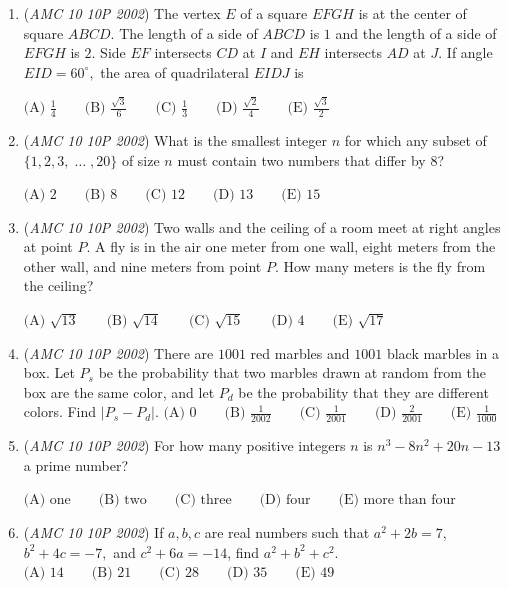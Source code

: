 \begin{enumerate}
 $\text{(A) }\frac{1}{3} \qquad \text{(B) }\frac{4}{11} \qquad \text{(C) }\frac{2}{5} \qquad \text{(D) }\frac{4}{9} \qquad \text{(E) }\frac{1}{2}$


	\item (\textit{AMC 10 10P 2002}) The vertex $E$ of a square $EFGH$ is at the center of square $ABCD.$ The length of a side of $ABCD$ is $1$ and the length of a side of $EFGH$ is $2.$ Side $EF$ intersects $CD$ at $I$ and $EH$ intersects $AD$ at $J.$ If angle $EID=60^{\circ},$ the area of quadrilateral $EIDJ$ is


 $\text{(A) }\frac{1}{4} \qquad \text{(B) }\frac{\sqrt{3}}{6} \qquad \text{(C) }\frac{1}{3} \qquad \text{(D) }\frac{\sqrt{2}}{4} \qquad \text{(E) }\frac{\sqrt{3}}{2}$


	\item (\textit{AMC 10 10P 2002}) What is the smallest integer $n$ for which any subset of $\{ 1, 2, 3, \; \dots \; , 20 \}$ of size $n$ must contain two numbers that differ by 8?


 $\text{(A) }2 \qquad \text{(B) }8 \qquad \text{(C) }12 \qquad \text{(D) }13 \qquad \text{(E) }15$


	\item (\textit{AMC 10 10P 2002}) Two walls and the ceiling of a room meet at right angles at point $P.$  A fly is in the air one meter from one wall, eight meters from the other wall, and nine meters from point $P$. How many meters is the fly from the ceiling?


 $\text{(A) }\sqrt{13} \qquad \text{(B) }\sqrt{14} \qquad \text{(C) }\sqrt{15} \qquad \text{(D) }4 \qquad \text{(E) }\sqrt{17}$


	\item (\textit{AMC 10 10P 2002}) There are $1001$ red marbles and $1001$ black marbles in a box. Let $P_s$ be the probability that two marbles drawn at random from the box are the same color, and let $P_d$ be the probability that they are different colors. Find $|P_s-P_d|.$
$\text{(A) }0 \qquad \text{(B) }\frac{1}{2002} \qquad \text{(C) }\frac{1}{2001} \qquad \text{(D) }\frac {2}{2001} \qquad \text{(E) }\frac{1}{1000}$


	\item (\textit{AMC 10 10P 2002}) For how many positive integers $n$ is $n^3 - 8n^2 + 20n - 13$ a prime number?


 $\text{(A) one} \qquad \text{(B) two} \qquad \text{(C) three} \qquad \text{(D) four} \qquad \text{(E) more than four}$


	\item (\textit{AMC 10 10P 2002}) If $a,b,c$ are real numbers such that $a^2 + 2b =7$, $b^2 + 4c= -7,$ and $c^2 + 6a= -14$, find $a^2 + b^2 + c^2.$
$\text{(A) }14 \qquad \text{(B) }21 \qquad \text{(C) }28 \qquad \text{(D) }35 \qquad \text{(E) }49$



\end{enumerate}
